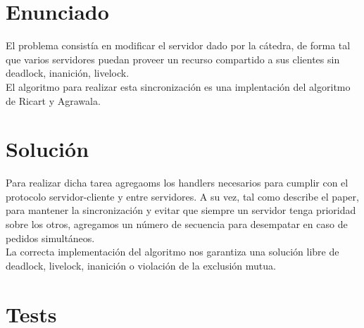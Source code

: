 \section{Enunciado}

El problema consistía en modificar el servidor dado por la cátedra, de forma tal que varios servidores puedan proveer un recurso compartido a sus clientes
sin deadlock, inanición, livelock.\\
El algoritmo para realizar esta sincronización es una implentación del algoritmo de Ricart y Agrawala.

\section{Solución}

Para realizar dicha tarea agregaoms los handlers necesarios para cumplir con el protocolo servidor-cliente y entre servidores.
A su vez, tal como describe el paper, para mantener la sincronización y evitar que siempre un servidor tenga prioridad sobre los otros, agregamos
un número de secuencia para desempatar en caso de pedidos simultáneos.\\
La correcta implementación del algoritmo nos garantiza una solución libre de deadlock, livelock,
inanición o violación de la exclusión mutua.

\section{Tests}
